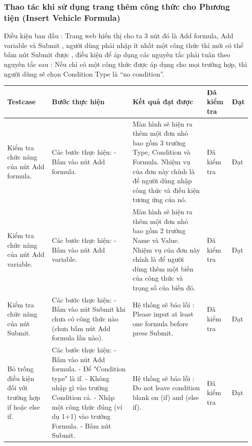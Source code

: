 \documentclass[a4paper]{article}
\begin{document}
\subsubsection{Thao tác khi sử dụng trang thêm công thức cho Phương tiện (Insert Vehicle Formula) }
Điều kiện ban đầu : Trang web hiển thị cho ta 3 nút đó là Add formula, Add variable và Submit , người dùng phải nhập ít nhất một công thức thì mới có thể bấm nút Submit được , điều kiện để áp dụng các nguyên tắc phải tuân theo nguyên tắc sau : Nếu chỉ có một công thức được áp dụng cho mọi trường hợp, thì người dùng sẽ chọn Condition Type là “no condition”.  \newline
\begin{longtable}{ | p{} |p{} | p{}  | p{}  | p{}  | } 
\hline
\textbf{Testcase}& \textbf{Bước thực hiện}& \textbf{Kết quả đạt được} & \textbf{Đã kiểm tra}& \textbf{Đạt} \\ 
\hline
\hline
Kiểm tra chức năng của nút Add formula. &
Các bước thực hiện: \newline
- Bấm vào nút Add formula.
&
Màn hình sẽ hiện ra thêm một đơn nhỏ bao gồm 3 trường Type, Condition và Formula. Nhiệm vụ của đơn này chính là để người dùng nhập công thức và điều kiện tương ứng của nó. &
Đã kiểm tra &
Đạt \\

\hline
Kiểm tra chức năng của nút Add variable. &
Các bước thực hiện: \newline
- Bấm vào nút Add variable.
&
Màn hình sẽ hiện ra thêm một đơn nhỏ bao gồm 2 trường Name và Value. Nhiệm vụ của đơn này chính là để người dùng thêm một biến của công thức và trọng số của biến đó. &
Đã kiểm tra &
Đạt \\

\hline
Kiểm tra chức năng của nút Submit. &
Các bước thực hiện: \newline
- Bấm vào nút Submit khi chưa có công thức nào (chưa bấm nút Add formula lần nào).
&
Hệ thống sẽ báo lỗi : Please input at least one formula before press Submit.
&
Đã kiểm tra &
Đạt \\

\hline
Bỏ trống điều kiện đối với trường hợp if hoặc else if. &
Các bước thực hiện: \newline
- Bấm vào nút Add formula. \newline
- Để "Condition type" là if. \newline
- Không nhập gì vào trường Condition cả. \newline
- Nhập một công thức đúng (ví dụ 1+1) vào trường Formula. \newline
- Bấm nút Submit.  
&
Hệ thống sẽ báo lỗi : Do not leave condition blank on (if) and (else if).
&
Đã kiểm tra &
Đạt \\


\end{longtable}
\end{document}
